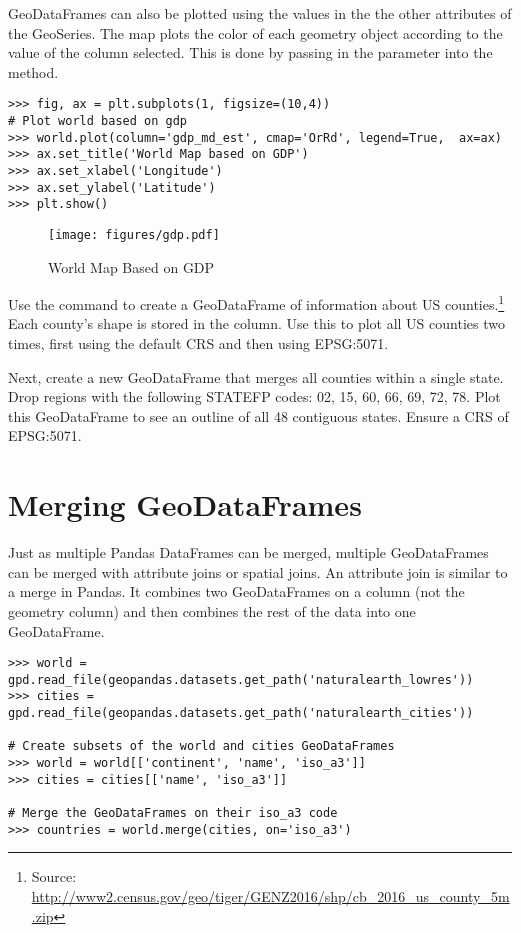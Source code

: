 GeoDataFrames can also be plotted using the values in the the other attributes of the GeoSeries.
The map plots the color of each geometry object according to the value of the column selected.
This is done by passing in the parameter  into the  method.

\begin{lstlisting}
>>> fig, ax = plt.subplots(1, figsize=(10,4))
# Plot world based on gdp
>>> world.plot(column='gdp_md_est', cmap='OrRd', legend=True,  ax=ax)
>>> ax.set_title('World Map based on GDP')
>>> ax.set_xlabel('Longitude')
>>> ax.set_ylabel('Latitude')
>>> plt.show()
\end{lstlisting}

\begin{figure}[H]
\begin{center}
\texttt{[image: figures/gdp.pdf]}
\end{center}
\caption{World Map Based on GDP}
\label{figure:gdp_map}
\end{figure}

\begin{problem}
Use the command  to create a GeoDataFrame of information about US counties.\footnote{Source: \url{http://www2.census.gov/geo/tiger/GENZ2016/shp/cb_2016_us_county_5m.zip}}
Each county's shape is stored in the  column.
Use this to plot all US counties two times, first using the default CRS and then using EPSG:5071.

Next, create a new GeoDataFrame that merges all counties within a single state.
Drop regions with the following STATEFP codes: 02, 15, 60, 66, 69, 72, 78.
Plot this GeoDataFrame to see an outline of all 48 contiguous states.
Ensure a CRS  of EPSG:5071.
\label{problem:us_counties}
\end{problem}

\section*{Merging GeoDataFrames} %

Just as multiple Pandas DataFrames can be merged, multiple GeoDataFrames can be merged with attribute joins or spatial joins.
An attribute join is similar to a merge in Pandas.
It combines two GeoDataFrames on a column (not the geometry column) and then combines the rest of the data into one GeoDataFrame.

\begin{lstlisting}
>>> world = gpd.read_file(geopandas.datasets.get_path('naturalearth_lowres'))
>>> cities = gpd.read_file(geopandas.datasets.get_path('naturalearth_cities'))

# Create subsets of the world and cities GeoDataFrames
>>> world = world[['continent', 'name', 'iso_a3']]
>>> cities = cities[['name', 'iso_a3']]

# Merge the GeoDataFrames on their iso_a3 code
>>> countries = world.merge(cities, on='iso_a3')
\end{lstlisting}

